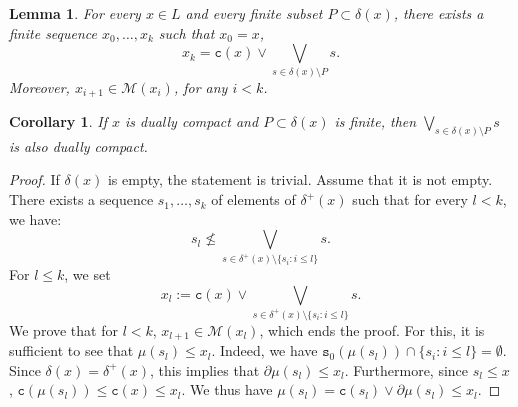 \documentclass{article}
\newtheorem{lemma}[theorem]{Lemma}
\newtheorem{corollary}[theorem]{Corollary}
\begin{document}



\begin{lemma}
    For every $x \in L$ and every finite subset $P \subset \delta(x)$, 
    there exists a finite sequence $x_0 , \ldots , x_k$ 
    such that $x_0 = x$,
    \[x_k = \texttt{c}(x) \vee \bigvee_{s \in \delta(x) \setminus P} s.\]
    Moreover, $x_{i+1} \in \mathcal{M}(x_i)$, for any $i<k$.
\end{lemma}

\begin{corollary}\label{corollary.submax.dominant}
    If $x$ is dually compact and $P \subset \delta(x)$ is finite, then $\bigvee_{s \in \delta(x) \setminus P} s$ is also dually compact.
\end{corollary}

\begin{proof}
If $\delta(x)$ is empty, the statement is trivial. Assume that it is not empty. There exists a sequence $s_1, \ldots, s_k$ of elements of $\delta^+(x)$ such that for every $l < k$, we have: 
\[s_l \not \le \bigvee_{s \in \delta^+(x) \setminus \{s_i : i \le l\}} s.\]
For $l \le k$, we set 
\[x_l := \texttt{c}(x) \vee \bigvee_{s \in \delta^+(x) \setminus \{s_i : i \le l\}} s.\]
We prove that for $l < k$, $x_{l+1} \in \mathcal{M}(x_l)$, which ends the proof. For this, it is sufficient to see that $\mu(s_l) \le x_l$. {Indeed, we have $\texttt{s}_0(\mu(s_l)) \cap \{s_i : i \le l\} = \emptyset$. Since $\delta(x) = \delta^+(x)$, this implies that $\partial \mu(s_l) \le x_l$. Furthermore, since $s_l \le x$, $\texttt{c}(\mu(s_l)) \le \texttt{c}(x) \le x_l$. We thus have $\mu(s_l) = \texttt{c}(s_l) \vee \partial \mu(s_l) \le x_l$.}
\end{proof}
\end{document}
